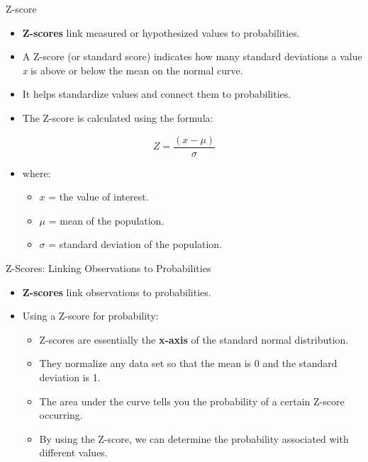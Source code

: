 \documentclass[
  ignorenonframetext,
]{beamer}
\providecommand{\tightlist}{%
  \setlength{\itemsep}{0pt}\setlength{\parskip}{0pt}}
\begin{document}
\begin{frame}{Z-score}
\label{z-score}
\begin{itemize}
\tightlist
\item
  \textbf{Z-scores} link measured or hypothesized values to
  probabilities.
\end{itemize}

\begin{itemize}
\tightlist
\item
  A Z-score (or standard score) indicates how many standard deviations a
  value \emph{\emph{x}} is above or below the mean on the normal curve.
\end{itemize}

\begin{itemize}
\item
  It helps standardize values and connect them to probabilities.
\item
  The Z-score is calculated using the formula:
\end{itemize}

\[ Z = \frac{(x - \mu)}{\sigma} \]

\begin{itemize}
\tightlist
\item
  where:

  \begin{itemize}
  \tightlist
  \item
    \(x\) = the value of interest.\\
  \item
    \(\mu\) = mean of the population.\\
  \item
    \(\sigma\) = standard deviation of the population.
  \end{itemize}
\end{itemize}
\end{frame}

\begin{frame}{Z-Scores: Linking Observations to Probabilities}
\label{z-scores-linking-observations-to-probabilities}
\begin{itemize}
\tightlist
\item
  \textbf{Z-scores} link observations to probabilities.
\item
  Using a Z-score for probability:

  \begin{itemize}
  \tightlist
  \item
    Z-scores are essentially the \textbf{x-axis} of the standard normal
    distribution.
  \item
    They normalize any data set so that the mean is 0 and the standard
    deviation is 1.
  \item
    The area under the curve tells you the probability of a certain
    Z-score occurring.
  \item
    By using the Z-score, we can determine the probability associated
    with different values.
  \end{itemize}
\end{itemize}
\end{frame}
\end{document}
